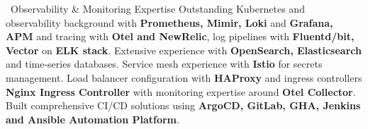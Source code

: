 \documentclass{resume} %
\begin{document}
\begin{rSection}{{\color{sectioncolor}\faChartLine}\ Observability \& Monitoring Expertise}
\smallbreak
Outstanding Kubernetes and observability background with \textbf{Prometheus, Mimir, Loki} and \textbf{Grafana, APM} and tracing with \textbf{Otel and NewRelic}, log pipelines with \textbf{Fluentd/bit, Vector} on \textbf{ELK stack}. Extensive experience with \textbf{OpenSearch, Elasticsearch} and time-series databases. Service mesh experience with \textbf{Istio} for secrets management. Load balancer configuration with \textbf{HAProxy} and ingress controllers \textbf{Nginx Ingress Controller} with monitoring expertise around \textbf{Otel Collector}. Built comprehensive CI/CD solutions using \textbf{ArgoCD, GitLab, GHA, Jenkins and Ansible Automation Platform}.
\end{rSection}

\end{document}
